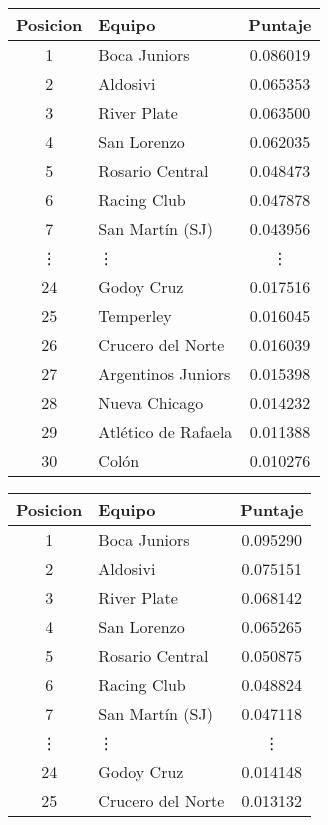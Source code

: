 \begin{table}[H]
    \begin{center}
        \begin{tabular}{| c | l | c |}
            \hline
            Posicion & Equipo & Puntaje \\ \hline
            1 & Boca Juniors & 0.086019 \\
            2 & Aldosivi & 0.065353 \\
            3 & River Plate & 0.063500 \\
            4 & San Lorenzo & 0.062035 \\
            5 & Rosario Central & 0.048473 \\
            6 & Racing Club & 0.047878 \\
            7 & San Martín (SJ) & 0.043956 \\
            \vdots & \quad\vdots & \vdots \\
            24 & Godoy Cruz & 0.017516 \\
            25 & Temperley & 0.016045 \\
            26 & Crucero del Norte & 0.016039 \\
            27 & Argentinos Juniors & 0.015398 \\
            28 & Nueva Chicago & 0.014232 \\
            29 & Atlético de Rafaela & 0.011388 \\
            30 & Colón & 0.010276 \\
            \hline
        \end{tabular}
        \begin{tabular}{| c | l | c |}
            \hline
            Posicion & Equipo & Puntaje \\ \hline
            1 & Boca Juniors & 0.095290 \\
            2 & Aldosivi & 0.075151 \\
            3 & River Plate & 0.068142 \\
            4 & San Lorenzo & 0.065265 \\
            5 & Rosario Central & 0.050875 \\
            6 & Racing Club & 0.048824 \\
            7 & San Martín (SJ) & 0.047118 \\
            \vdots & \quad\vdots & \vdots \\
            24 & Godoy Cruz & 0.014148 \\
            25 & Crucero del Norte & 0.013132 \\

\end{tabular}
\end{center}
\end{table}
